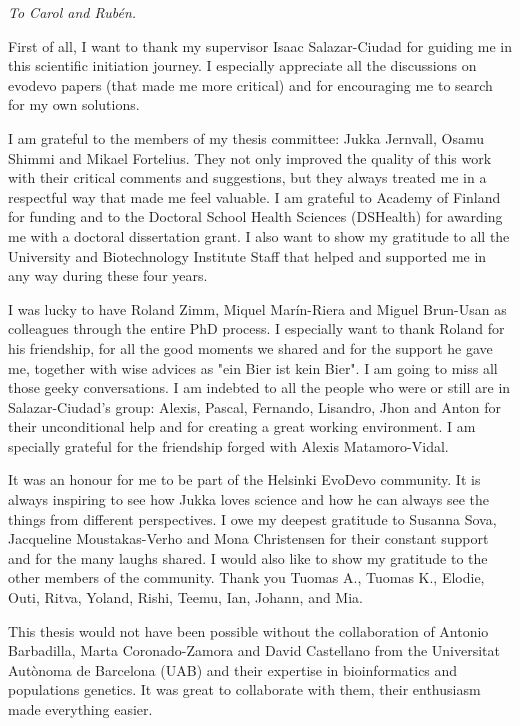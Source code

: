 \setlength{\epigraphrule}{0\p@}
\setlength{\epigraphwidth}{.28\textwidth}
\epigraph{\large{\textit{To Carol and Rub\'{e}n.}}}{}

First of all, I want to thank my supervisor Isaac Salazar-Ciudad for guiding me in this scientific initiation journey. I especially appreciate all the discussions on evodevo papers (that made me more critical) and for encouraging me to search for my own solutions. 
\vspace{1ex}

I am grateful to the members of my thesis committee: Jukka Jernvall, Osamu Shimmi and Mikael Fortelius. They not only improved the quality of this work with their critical comments and suggestions, but they always treated me in a respectful way that made me feel valuable.
I am grateful to Academy of Finland for funding and to the Doctoral School Health Sciences (DSHealth) for awarding me with a doctoral dissertation grant.
I also want to show my gratitude to all the University and Biotechnology Institute Staff that helped and supported me in any way during these four years.
\vspace{1ex}

I was lucky to have Roland Zimm, Miquel Mar\'{i}n-Riera and Miguel Brun-Usan as colleagues through the entire PhD process. I especially want to thank Roland for his friendship, for all the good moments we shared and for the support he gave me, together with wise advices as "ein Bier ist kein Bier". I am going to miss all those geeky conversations.
%
I am indebted to all the people who were or still are in Salazar-Ciudad's group: Alexis, Pascal, Fernando, Lisandro, Jhon and Anton for their unconditional help and for creating a great working environment. I am specially grateful for the friendship forged with Alexis Matamoro-Vidal.
\vspace{1ex}

It was an honour for me to be part of the Helsinki EvoDevo community. It is always inspiring to see how Jukka loves science and how he can always see the things from different perspectives. I owe my deepest gratitude to Susanna Sova, Jacqueline Moustakas-Verho and Mona Christensen for their constant support and for the many laughs shared. I would also like to show my gratitude to the other members of the community. Thank you Tuomas A., Tuomas K., Elodie, Outi, Ritva, Yoland, Rishi, Teemu, Ian, Johann, and Mia.  

\vspace{1ex}
This thesis would not have been possible without the collaboration of Antonio Barbadilla, Marta Coronado-Zamora and David Castellano from the Universitat Aut\`{o}noma de Barcelona (UAB) and their expertise in bioinformatics and populations genetics. It was great to collaborate with them, their enthusiasm made everything easier.

